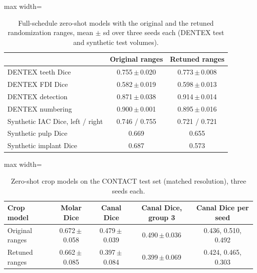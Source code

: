 \documentclass[12pt]{article}
\newcommand{\pmsd}[2]{#1\,$\pm$\,#2}
\begin{document}
\begin{table}[h]
\centering\small
\caption{Full-schedule zero-shot models with the original and the retuned randomization ranges, mean $\pm$ sd over three
seeds each (DENTEX test and synthetic test volumes).}
\label{tab:retune}
\begin{adjustbox}{max width=\linewidth}
\begin{tabular}{@{}lcccc@{}}
\toprule
& \multicolumn{2}{c}{Original ranges} & \multicolumn{2}{c}{Retuned ranges} \\
\midrule
DENTEX teeth Dice & \multicolumn{2}{c}{\pmsd{0.755}{0.020}} & \multicolumn{2}{c}{\pmsd{0.773}{0.008}} \\
DENTEX FDI Dice & \multicolumn{2}{c}{\pmsd{0.582}{0.019}} & \multicolumn{2}{c}{\pmsd{0.598}{0.013}} \\
DENTEX detection & \multicolumn{2}{c}{\pmsd{0.871}{0.038}} & \multicolumn{2}{c}{\pmsd{0.914}{0.014}} \\
DENTEX numbering & \multicolumn{2}{c}{\pmsd{0.900}{0.001}} & \multicolumn{2}{c}{\pmsd{0.895}{0.016}} \\
Synthetic IAC Dice, left / right & \multicolumn{2}{c}{0.746 / 0.755} & \multicolumn{2}{c}{0.721 / 0.721} \\
Synthetic pulp Dice & \multicolumn{2}{c}{0.669} & \multicolumn{2}{c}{0.655} \\
Synthetic implant Dice & \multicolumn{2}{c}{0.687} & \multicolumn{2}{c}{0.573} \\
\bottomrule
\end{tabular}
\end{adjustbox}
\end{table}

\begin{table}[h]
\centering\small
\caption{Zero-shot crop models on the CONTACT test set (matched resolution), three seeds each.}
\label{tab:crop}
\begin{adjustbox}{max width=\linewidth}
\begin{tabular}{@{}lcccc@{}}
\toprule
Crop model & Molar Dice & Canal Dice & Canal Dice, group 3 & Canal Dice per seed \\
\midrule
Original ranges & \pmsd{0.672}{0.058} & \pmsd{0.479}{0.039} & \pmsd{0.490}{0.036} & 0.436, 0.510, 0.492 \\
Retuned ranges & \pmsd{0.662}{0.085} & \pmsd{0.397}{0.084} & \pmsd{0.399}{0.069} & 0.424, 0.465, 0.303 \\
\bottomrule
\end{tabular}
\end{adjustbox}
\end{table}
\end{document}
